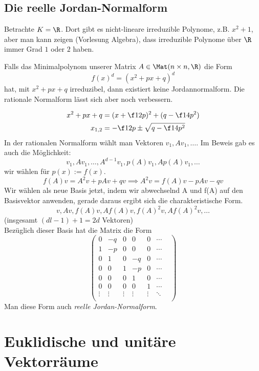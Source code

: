 \documentclass{mycourse}
\begin{document}
\section{Die reelle Jordan-Normalform}


Betrachte $K=\R$.
Dort gibt es nicht-lineare irreduzible Polynome, z.B. $x^2+1$, aber man kann zeigen (Vorlesung Algebra), dass irreduzible Polynome über $\R$ immer Grad $1$ oder $2$ haben.

Falls das Minimalpolynom unserer Matrix $A \in \Mat(n\times n, \R)$  die Form
\[
	f(x)^d = (x^2+px+q)^d
\]
hat, mit $x^2+px+q$ irreduzibel, dann existiert keine Jordannormalform.
Die rationale Normalform lässt sich aber noch verbessern.

\begin{align*}
	x^2+px+q &= (x+\f 12 p)^2 + (q-\f 14 p^2)\\
	 x_{1,2} &= -\f 12 p \pm \sqrt{q-\f 14 p^2}
\end{align*}
In der rationalen Normalform wählt man Vektoren $v_1, Av_1, \dotsc$.
Im Beweis gab es auch die Möglichkeit:
\[
	v_1, Av_1, \dotsc, A^{d-1}v_1, p(A)v_1, Ap(A)v_1, \dotsc
\]
wir wählen für $p(x) := f(x)$.
\[
	f(A)v = A^2v +pAv + qv \implies A^2v = f(A)v - pAv -qv
\]
Wir wählen als neue Basis jetzt, indem wir abwechselnd A und f(A) auf den Basisvektor anwenden, gerade daraus ergibt sich die charakteristische Form.
\[
	v, Av, f(A)v, Af(A)v, f(A)^2v, Af(A)^2v,\dotsc
\]
(insgesamt $(dl-1)+1 = 2d$ Vektoren)\\
Bezüglich dieser Basis hat die Matrix die Form
\[
	\begin{pmatrix}
		0 & -q & 0 & 0  & 0 & \cdots \\
		1 & -p & 0 & 0  & 0 & \cdots\\
		0 & 1  & 0 & -q & 0 & \cdots\\
		0 & 0  & 1 & -p & 0 & \cdots\\
		0 & 0  & 0 & 1  & 0 & \cdots\\
		0 & 0  & 0 & 0  & 1 & \cdots\\
		\vdots & \vdots & \vdots & \vdots & \vdots & \ddots & \\
	\end{pmatrix}
\]
Man diese Form auch \emph{reelle Jordan-Normalform}.




\chapter{Euklidische und unitäre Vektorräume}
\end{document}
